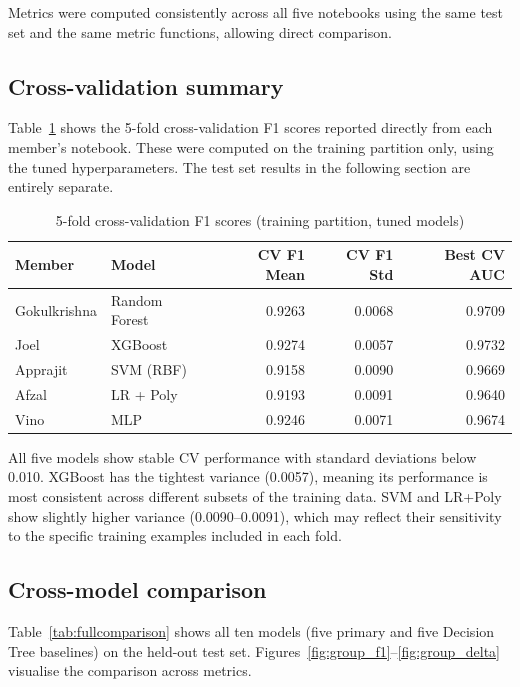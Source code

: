 \documentclass[12pt,a4paper]{article}
\begin{document}
Metrics were computed consistently across all five notebooks using the same test set and the same metric functions, allowing direct comparison.

\subsection{Cross-validation summary}
\label{subsec:cvsummary}

Table~\ref{tab:cvcomparison} shows the 5-fold cross-validation F1 scores reported directly from each member's notebook. These were computed on the training partition only, using the tuned hyperparameters. The test set results in the following section are entirely separate.

\begin{table}[H]
  \centering
  \caption{5-fold cross-validation F1 scores (training partition, tuned models)}
  \label{tab:cvcomparison}
  \small
  \begin{tabular}{llrrr}
    \toprule
    \textbf{Member} & \textbf{Model} & \textbf{CV F1 Mean} & \textbf{CV F1 Std} & \textbf{Best CV AUC} \\
    \midrule
    Gokulkrishna & Random Forest  & 0.9263 & 0.0068 & 0.9709 \\
    Joel         & XGBoost        & 0.9274 & 0.0057 & 0.9732 \\
    Apprajit     & SVM (RBF)      & 0.9158 & 0.0090 & 0.9669 \\
    Afzal        & LR + Poly      & 0.9193 & 0.0091 & 0.9640 \\
    Vino         & MLP            & 0.9246 & 0.0071 & 0.9674 \\
    \bottomrule
  \end{tabular}
\end{table}

All five models show stable CV performance with standard deviations below 0.010. XGBoost has the tightest variance (0.0057), meaning its performance is most consistent across different subsets of the training data. SVM and LR+Poly show slightly higher variance (0.0090--0.0091), which may reflect their sensitivity to the specific training examples included in each fold.

\subsection{Cross-model comparison}
\label{subsec:comparison}

Table~\ref{tab:fullcomparison} shows all ten models (five primary and five Decision Tree baselines) on the held-out test set. Figures~\ref{fig:group_f1}--\ref{fig:group_delta} visualise the comparison across metrics.
\end{document}
